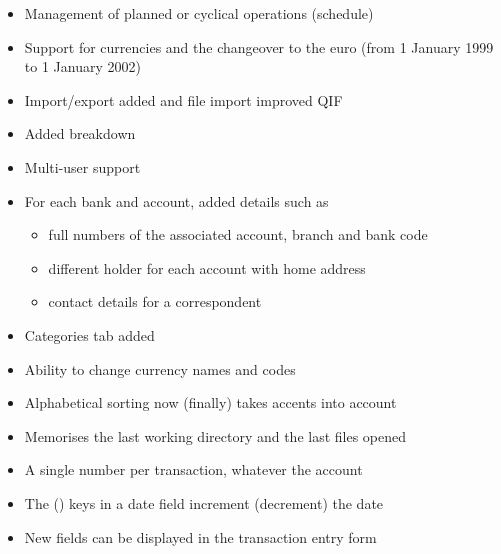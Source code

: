 \begin{itemize}
	\item Management of planned or cyclical operations (schedule)%
	\item Support for currencies and the changeover to the euro (from 1 January 1999 to 1 January 2002)%
	\item Import/export added and file import improved \gls{QIF}%
	\item Added breakdown%
	\item Multi-user support%
	\item For each bank and account, added details such as%
	\begin{itemize}
		\item full numbers of the associated account, branch and bank code%
		\item different holder for each account with home address%
		\item contact details for a correspondent%
	\end{itemize}
	\item Categories tab added%
	\item Ability to change currency names and codes%
	\item Alphabetical sorting now (finally) takes accents into account%
	\item Memorises the last working directory and the last files opened%
	\item A single number per transaction, whatever the account%
	\item The \key{+} (\key{-}) keys in a date field increment (decrement) the date%
	\item New fields can be displayed in the transaction entry form%

\end{itemize}
